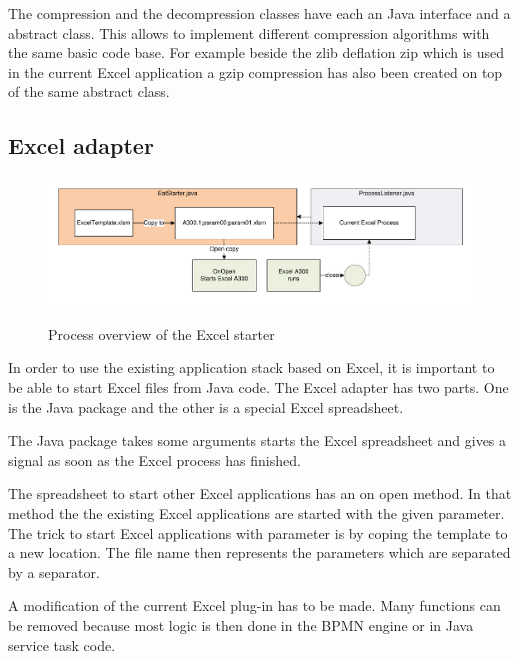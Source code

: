\documentclass[paper=a4,twoside=false,BCOR=0mm,DIV=calc,fontsize=12pt]{scrartcl}
\begin{document}
The compression and the decompression classes have each an Java interface and a abstract class. This allows to implement different compression algorithms with the same basic code base. For example beside the zlib deflation zip which is used in the current Excel application a gzip compression has also been created on top of the same abstract class.


\subsection{Excel adapter}

\begin{figure}
    \begin{center}
      \includegraphics[width=1\textwidth]{./img/eatstarterOverview.pdf}\\
    \end{center}
  \caption{Process overview of the Excel starter}
  \label{eatstarteroverview}
\end{figure} 

In order to use the existing application stack based on Excel, it is important to be able to start Excel files from Java code. 
The Excel adapter has two parts. One is the Java package and the other is a special Excel spreadsheet. 

The Java package takes some arguments starts the Excel spreadsheet and gives a signal as soon as the Excel process has finished.

The spreadsheet to start other Excel applications has an on open method. In that method the the existing Excel applications are started with the given parameter. The trick to start Excel applications with parameter is by coping the template to a new location. The file name then represents the parameters which are separated by a separator.

A modification of the current Excel plug-in has to be made. Many functions can be removed because most logic is then done in the BPMN engine or in Java service task code.
\end{document}

